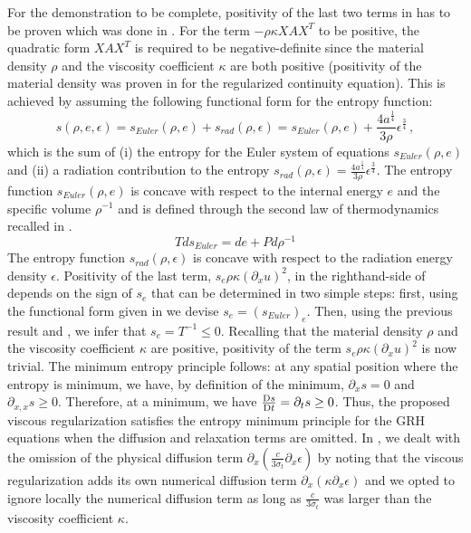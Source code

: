 \documentclass[review]{elsarticle}
\begin{document}
 For the demonstration to be complete, positivity of the last two terms in  has to be proven which was done in \cite{our_jcp_radhy_paper}. For the term $- \rho \kappa X A X^T$ to be positive, the quadratic form $ X A X^T$ is required to be negative-definite since the material density $\rho$ and the viscosity coefficient $\kappa$ are both positive (positivity of the material density was proven in \cite{jlg} for the regularized continuity equation). This is achieved by assuming the following functional form for the entropy function:
%
\begin{equation}\label{eq:ent_equ}
s( \rho, e, \epsilon) = s_{Euler}(\rho, e) + s_{rad}(\rho, \epsilon) = s_{Euler}(\rho, e)+ \frac{4a^{\tfrac{1}{4}}}{3\rho} \epsilon^{\tfrac{3}{4}} \, ,
\end{equation}
%
which is the sum of (i) the entropy for the Euler system of equations $s_{Euler}(\rho, e)$ and (ii) a radiation contribution to the entropy $s_{rad}(\rho,\epsilon)=\tfrac{4 a^\frac{1}{4}}{3\rho} \epsilon^\frac{3}{4}$. 
The entropy function $s_{Euler}(\rho, e)$ is concave with respect to the internal energy $e$ and the specific volume $\rho^{-1}$ and is defined through the second law of thermodynamics recalled in .
%
\begin{equation}\label{eq:scn-law-th}
Tds_{Euler} = de + P d \rho^{-1}
\end{equation}
%
The entropy function $s_{rad}(\rho,\epsilon)$ is concave with respect to the radiation energy density $\epsilon$. Positivity of the last term, $s_e \rho \kappa (\partial_x u)^2$, in the righthand-side of  depends on the sign of $s_e$ that can be determined in two simple steps: first, using the functional form given in  we devise $s_e = (s_{Euler})_e$. Then, using the previous result and , we infer that $s_e = T^{-1} \leq 0$. Recalling that the material density $\rho$ and the viscosity coefficient $\kappa$ are positive, positivity of the term $s_e \rho \kappa (\partial_x u)^2$ is now trivial.
%
The minimum entropy principle follows: at any spatial position where the entropy is minimum, we have, by definition of the minimum, $\partial_x s =0$ and $\partial_{x,x} s \geq 0$. Therefore, at a minimum, we have $\frac{\textrm{D} s}{\textrm{D} t}=\partial_t s \geq 0$. Thus, the proposed viscous regularization satisfies the entropy minimum principle for the GRH equations when the diffusion and relaxation terms are omitted. In \cite{our_jcp_radhy_paper}, we dealt with the omission of the physical diffusion term $\partial_x( \tfrac{c}{3 \sigma_t} \partial_x \epsilon)$ by noting that the viscous regularization adds its own numerical diffusion term $\partial_x \left( \kappa \partial_x \epsilon \right)$ and we opted to ignore locally the numerical diffusion term as long as $\frac{c}{3 \sigma_t}$ was larger than the viscosity coefficient $\kappa$. 
\end{document}
